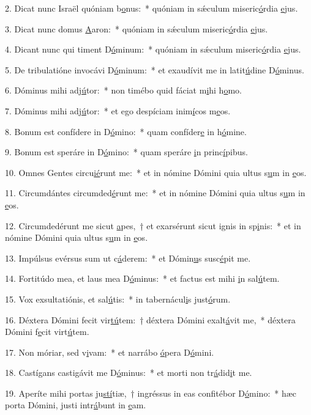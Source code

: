 2. Dicat nunc Israël quóniam b\uline{o}nus:~* quóniam in sǽculum miseric\uline{ó}rdia \uline{e}jus.\par 
3. Dicat nunc domus \uline{A}aron:~* quóniam in sǽculum miseric\uline{ó}rdia \uline{e}jus.\par 
4. Dicant nunc qui timent D\uline{ó}minum:~* quóniam in sǽculum miseric\uline{ó}rdia \uline{e}jus.\par 
5. De tribulatióne invocávi D\uline{ó}minum:~* et exaudívit me in latit\uline{ú}dine D\uline{ó}minus.\par 
6. Dóminus mihi adj\uline{ú}tor:~* non timébo quid fáciat m\uline{i}hi h\uline{o}mo.\par 
7. Dóminus mihi adj\uline{ú}tor:~* et ego despíciam inim\uline{í}cos m\uline{e}os.\par 
8. Bonum est confídere in D\uline{ó}mino:~* quam confíder\uline{e} in h\uline{ó}mine.\par 
9. Bonum est speráre in D\uline{ó}mino:~* quam speráre \uline{i}n princ\uline{í}pibus.\par 
10. Omnes Gentes circu\uline{ié}runt me:~* et in nómine Dómini quia ultus s\uline{u}m in \uline{e}os.\par 
11. Circumdántes circumded\uline{é}runt me:~* et in nómine Dómini quia ultus s\uline{u}m in \uline{e}os.\par 
12. Circumdedérunt me sicut \uline{a}pes,~† et exarsérunt sicut ignis in sp\uline{i}nis:~* et in nómine Dómini quia ultus s\uline{u}m in \uline{e}os.\par 
13. Impúlsus evérsus sum ut c\uline{á}derem:~* et Dómin\uline{u}s susc\uline{é}pit me.\par 
14. Fortitúdo mea, et laus mea D\uline{ó}minus:~* et factus est mihi \uline{i}n sal\uline{ú}tem.\par 
15. Vox exsultatiónis, et sal\uline{ú}tis:~* in tabernácul\uline{i}s just\uline{ó}rum.\par 
16. Déxtera Dómini fecit vir\uline{tú}tem:~† déxtera Dómini exalt\uline{á}vit me,~* déxtera Dómini f\uline{e}cit virt\uline{ú}tem.\par 
17. Non móriar, sed v\uline{i}vam:~* et narrábo \uline{ó}pera D\uline{ó}mini.\par 
18. Castígans castigávit me D\uline{ó}minus:~* et morti non tr\uline{á}did\uline{i}t me.\par 
19. Aperíte mihi portas ju\uline{stí}tiæ,~† ingréssus in eas confitébor D\uline{ó}mino:~* hæc porta Dómini, justi intr\uline{á}bunt in \uline{e}am.\par 
